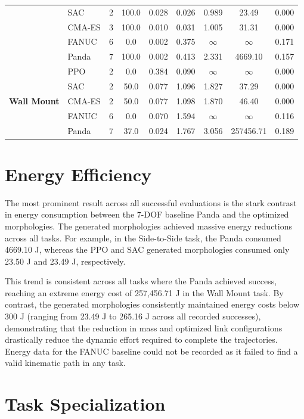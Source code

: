 \documentclass[defaultstyle,11pt]{thesis}
\begin{document}
\begin{table}[tbp]
{\begin{tabular}{llccccccc}
            & SAC & 2 & 100.0 & 0.028 & 0.026 & 0.989 & 23.49 & 0.000 \\
            & CMA-ES & 3 & 100.0 & 0.010 & 0.031 & 1.005 & 31.31 & 0.000 \\
            & FANUC & 6 & 0.0 & 0.002 & 0.375 & $\infty$ & $\infty$ & 0.171 \\
            & Panda & 7 & 100.0 & 0.002 & 0.413 & 2.331 & 4669.10 & 0.157 \\
            \midrule
            \multirow{5}{*}{\textbf{Wall Mount}} 
            & PPO & 2 & 0.0 & 0.384 & 0.090 & $\infty$ & $\infty$ & 0.000 \\
            & SAC & 2 & 50.0 & 0.077 & 1.096 & 1.827 & 37.29 & 0.000 \\
            & CMA-ES & 2 & 50.0 & 0.077 & 1.098 & 1.870 & 46.40 & 0.000 \\
            & FANUC & 6 & 0.0 & 0.070 & 1.594 & $\infty$ & $\infty$ & 0.116 \\
            & Panda & 7 & 37.0 & 0.024 & 1.767 & 3.056 & 257456.71 & 0.189 \\
            \bottomrule
        \end{tabular}
    }
\end{table}

\section{Energy Efficiency}

The most prominent result across all successful evaluations is the stark contrast in energy consumption between the 7-DOF baseline Panda and the optimized morphologies. The generated morphologies achieved massive energy reductions across all tasks. For example, in the Side-to-Side task, the Panda consumed 4669.10 J, whereas the PPO and SAC generated morphologies consumed only 23.50 J and 23.49 J, respectively. 

This trend is consistent across all tasks where the Panda achieved success, reaching an extreme energy cost of 257,456.71 J in the Wall Mount task. By contrast, the generated morphologies consistently maintained energy costs below 300 J (ranging from 23.49 J to 265.16 J across all recorded successes), demonstrating that the reduction in mass and optimized link configurations drastically reduce the dynamic effort required to complete the trajectories. Energy data for the FANUC baseline could not be recorded as it failed to find a valid kinematic path in any task.

\section{Task Specialization}
\end{document}
